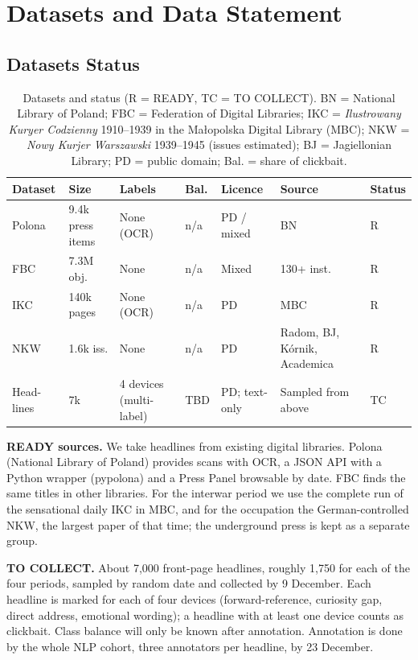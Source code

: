 \documentclass[11pt]{article}
\begin{document}
\section{Datasets and Data Statement}

\subsection{Datasets Status}
\begin{table}[t]
\centering
\scriptsize
\setlength{\tabcolsep}{3pt}
\begin{tabular}{@{}p{0.95cm} p{0.85cm} p{1.15cm} p{0.45cm} p{0.95cm} p{1.5cm} p{0.5cm}@{}}
\toprule
\textbf{Dataset} & \textbf{Size} & \textbf{Labels} & \textbf{Bal.} & \textbf{Licence} & \textbf{Source} & \textbf{Status} \\ \midrule
Polona & 9.4k press items & None (OCR) & n/a & PD / mixed & BN & R \\
FBC & 7.3M obj. & None & n/a & Mixed & 130+ inst. & R \\
IKC & 140k pages & None (OCR) & n/a & PD & MBC & R \\
NKW & 1.6k iss. & None & n/a & PD & Radom, BJ, K\'ornik, Academica & R \\
Head-lines & 7k & 4 devices (multi-label) & TBD & PD; text-only & Sampled from above & TC \\
\bottomrule
\end{tabular}
\caption{Datasets and status (R = READY, TC = TO COLLECT). BN = National Library of Poland; FBC = Federation of Digital Libraries; IKC = \emph{Ilustrowany Kuryer Codzienny} 1910--1939 in the Ma{\l}opolska Digital Library (MBC); NKW = \emph{Nowy Kurjer Warszawski} 1939--1945 (issues estimated); BJ = Jagiellonian Library; PD = public domain; Bal. = share of clickbait.}
\label{tab:datasets}
\end{table}

\textbf{READY sources.} We take headlines from existing digital libraries. Polona (National Library of Poland) provides scans with OCR, a JSON API with a Python wrapper (pypolona) and a Press Panel browsable by date. FBC finds the same titles in other libraries. For the interwar period we use the complete run of the sensational daily IKC in MBC, and for the occupation the German-controlled NKW, the largest paper of that time; the underground press is kept as a separate group.

\textbf{TO COLLECT.} About 7,000 front-page headlines, roughly 1,750 for each of the four periods, sampled by random date and collected by 9 December. Each headline is marked for each of four devices (forward-reference, curiosity gap, direct address, emotional wording); a headline with at least one device counts as clickbait. Class balance will only be known after annotation. Annotation is done by the whole NLP cohort, three annotators per headline, by 23 December.
\end{document}
